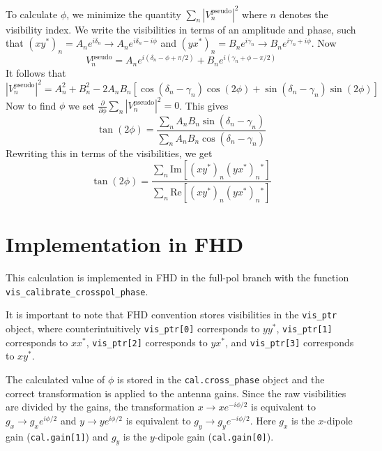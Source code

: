 \documentclass[a4paper,11pt]{article}
\begin{document}
To calculate $\phi$, we minimize the quantity $\sum_n |V^{\text{pseudo}}_n|^2$ where $n$ denotes the visibility index. We write the visibilities in terms of an amplitude and phase, such that $(xy^*)_n = A_n e^{i\delta_n} \rightarrow A_n e^{i\delta_n - i\phi}$ and $(yx^*)_n = B_n e^{i\gamma_n} \rightarrow B_n e^{i\gamma_n + i\phi}$. Now 
\begin{equation}
V^{\text{pseudo}}_n = A_n e^{i(\delta_n - \phi + \pi/2)} + B_n e^{i(\gamma_n + \phi - \pi/2)}
\end{equation}
It follows that
\begin{equation}
|V^{\text{pseudo}}_n|^2 = A_n^2 + B_n^2 - 2 A_n B_n \left[ \cos(\delta_n - \gamma_n) \cos(2 \phi) + \sin(\delta_n - \gamma_n) \sin(2 \phi) \right]
\end{equation}
Now to find $\phi$ we set $\frac{\partial}{\partial \phi} \sum_n |V^{\text{pseudo}}_n|^2 = 0$. This gives
\begin{equation}
\tan(2 \phi) = \frac{\sum_n A_n B_n \sin(\delta_n - \gamma_n)}{\sum_n A_n B_n \cos(\delta_n - \gamma_n)}
\end{equation}
Rewriting this in terms of the visibilities, we get
\begin{equation}
\tan(2 \phi) = \frac{\sum_n \text{Im} \left[ (xy^*)_n (yx^*)_n{}^* \right]}{\sum_n \text{Re} \left[ (xy^*)_n (yx^*)_n{}^* \right]}
\end{equation}


\section{Implementation in FHD}

This calculation is implemented in FHD in the full-pol branch with the function \linebreak[4] \texttt{vis\_calibrate\_crosspol\_phase}. 

It is important to note that FHD convention stores visibilities in the \texttt{vis\_ptr} object, where counterintuitively \texttt{vis\_ptr[0]} corresponds to $yy^*$, \texttt{vis\_ptr[1]} corresponds to $xx^*$, \texttt{vis\_ptr[2]} corresponds to $yx^*$, and \texttt{vis\_ptr[3]} corresponds to $xy^*$.

The calculated value of $\phi$ is stored in the \texttt{cal.cross\_phase} object and the correct transformation is applied to the antenna gains. Since the raw visibilities are divided by the gains, the transformation $x \rightarrow x e^{-i \phi/2}$ is equivalent to $g_x \rightarrow g_x e^{i \phi/2}$ and $y \rightarrow y e^{i \phi/2}$ is equivalent to $g_y \rightarrow g_y e^{-i \phi/2}$. Here $g_x$ is the $x$-dipole gain (\texttt{cal.gain[1]}) and $g_y$ is the $y$-dipole gain (\texttt{cal.gain[0]}).
\end{document}
